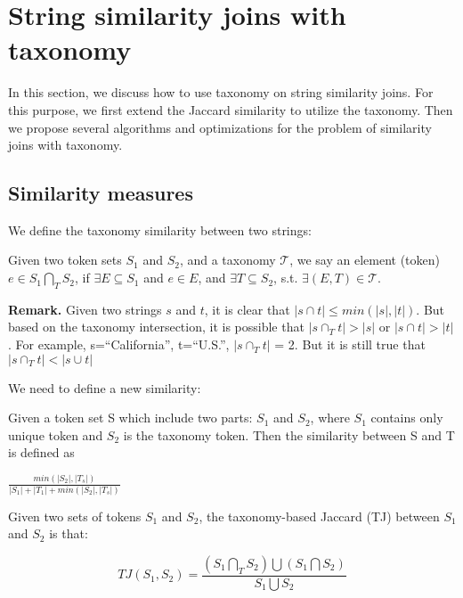 
\section{String similarity joins with taxonomy}


In this section, we discuss how to use taxonomy on string similarity joins. For this purpose, we first extend the Jaccard similarity to utilize the taxonomy. Then we propose several algorithms and optimizations for the problem of similarity joins with taxonomy.



\subsection{Similarity measures}


We define the taxonomy similarity between two strings:

\begin{definition}
Given two token sets $S_1$ and $S_2$, and a taxonomy $\mathcal{T}$, we say an element (token) $e \in S_1 \bigcap_T S_2$, if $ \exists E \subseteq S_1$ and $e \in E$, and $\exists T \subseteq S_2$, s.t. $\exists (E,T) \in \mathcal{T}$.\end{definition}


\noindent \textbf{Remark.}  Given two strings $s$ and $t$, it is clear that $|s \cap t| \leq min (|s|,|t|)$. But based on the taxonomy intersection, it is possible that $|s \cap_T t| > |s| $ or $|s \cap t| > |t| $. For example, s=``California'', t=``U.S.'', $|s \cap_T t|$ = 2. But it is still true that $|s \cap_T t| < |s \cup t|$

We need to define a new similarity:

Given a token set S which include two parts: $S_1$ and $S_2$, where $S_1$ contains only unique token and $S_2$ is the taxonomy token. Then the similarity between S and T is defined as

$\frac{min(|S_2|,|T_s|)}{|S_1|+|T_1|+min(|S_2|,|T_s|)}$

\begin{definition}   Given two sets of tokens $S_1$ and $S_2$,  the taxonomy-based Jaccard (TJ) between $S_1$ and $S_2$ is that:

\begin{equation}
TJ(S_1,S_2)=  \frac{(S_1 \bigcap_T S_2) \bigcup (S_1 \bigcap S_2) }{S_1 \bigcup S_2}
\end{equation} \end{definition}

